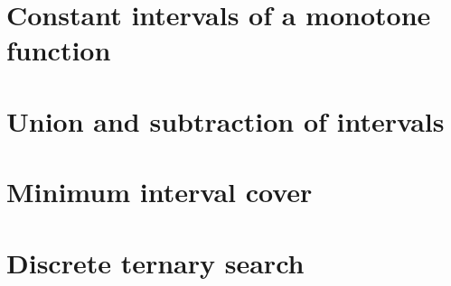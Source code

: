 \section{Constant intervals of a monotone function}

\section{Union and subtraction of intervals}

\section{Minimum interval cover}

\section{Discrete ternary search}

